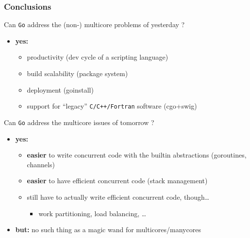 \documentclass[bigger]{beamer}
\providecommand{\alert}[1]{\textbf{#1}}
\begin{document}
\begin{frame}
\frametitle{Conclusions}
\label{sec-1-26}


Can \verb~Go~ address the (non-) multicore problems of yesterday ?

\begin{itemize}
\item \alert{yes:}
\begin{itemize}
\item productivity (dev cycle of a scripting language)
\item build scalability (package system)
\item deployment (goinstall)
\item support for ``legacy'' \verb~C/C++/Fortran~ software (cgo+swig)
\end{itemize}
\end{itemize}

\vspace

Can \verb~Go~ address the multicore issues of tomorrow ?

\begin{itemize}
\item \alert{yes:}
\begin{itemize}
\item \alert{easier} to write concurrent code with the builtin abstractions
    (goroutines, channels)
\item \alert{easier} to have efficient concurrent code (stack management)
\item still have to actually write efficient concurrent code, though\ldots{}
\begin{itemize}
\item work partitioning, load balancing, \ldots{}
\end{itemize}
\end{itemize}
\item \textbf{but:} no such thing as a magic wand for multicores/manycores
\end{itemize}
\end{frame}
\end{document}
